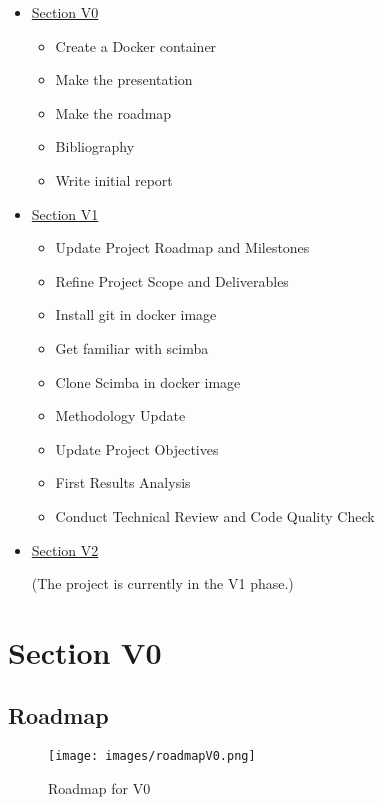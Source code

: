 \documentclass[12pt]{article}
\begin{document}
\begin{itemize}
\item{\hyperref[sec:Section V0]{Section V0}}
\begin{itemize}
    \item Create a Docker container
    \item Make the presentation
    \item Make the roadmap
    \item Bibliography
    \item Write initial report
\end{itemize}

\item{\hyperref[sec:Section V1]{Section V1}}
\begin{itemize}
    \item Update Project Roadmap and Milestones
    \item Refine Project Scope and Deliverables
    \item Install git in docker image
    \item Get familiar with scimba	
    \item Clone Scimba in docker image	
    \item Methodology Update 
    \item Update Project Objectives
    \item First Results Analysis
    \item Conduct Technical Review and Code Quality Check 
\end{itemize}

\item{\hyperref[sec:Section V2]{Section V2}}

(The project is currently in the V1 phase.)
\end{itemize}

\newpage

\section{Section V0}  
\label{sec:Section V0}

\newpage

\subsection{Roadmap}
\begin{figure}[H]
    \centering
    \texttt{[image: images/roadmapV0.png]}
    \caption{Roadmap for V0}
\end{figure}
\end{document}
